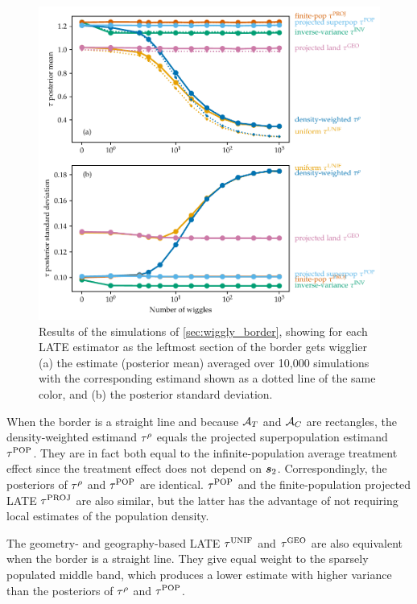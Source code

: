 \begin{figure}[!tb]
	\centering
	\includegraphics[height=0.6\textheight]{figures/wiggly_boundaries_posteriors.pdf}
	\caption{
		\label{fig:wiggly_boundaries_posteriors}
		Results of the simulations of \autoref{sec:wiggly_border}, showing for each LATE estimator as the leftmost section of the border gets wigglier (a) the estimate (posterior mean) averaged over 10,000 simulations with the corresponding estimand shown as a dotted line of the same color, and (b) the posterior standard deviation.
	}
\end{figure}
    
	When the border is a straight line and because \(\mathcal{A}{}_{T}\) and \(\mathcal{A}{}_{C}\) are rectangles, the density-weighted estimand \(\tau^{\rho}\) equals the projected superpopulation estimand \(\tau^{\mathrm{POP}}\).
They are in fact both equal to the infinite-population average treatment effect since the treatment effect does not depend on \(\bm{s}_2\).
Correspondingly, the posteriors of \(\tau^{\rho}\) and \(\tau^{\mathrm{POP}}\) are identical.
\(\tau^{\mathrm{POP}}\) and the finite-population projected LATE \(\tau^{\mathrm{PROJ}}\) are also similar, but the latter has the advantage of not requiring local estimates of the population density.

	The geometry- and geography-based LATE \(\tau^{\mathrm{UNIF}}\) and \(\tau^{\mathrm{GEO}}\) are also equivalent when the border is a straight line.
They give equal weight to the sparsely populated middle band, which produces a lower estimate with higher variance than the posteriors of \(\tau^{\rho}\) and \(\tau^{\mathrm{POP}}\).

